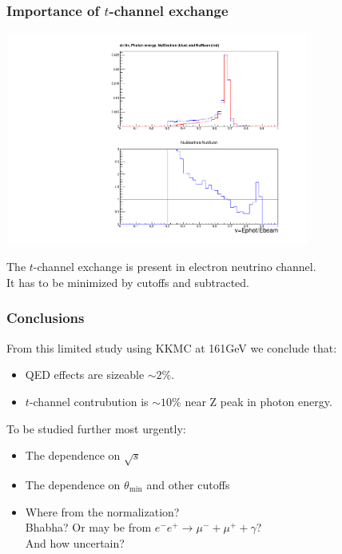 \documentclass{beamer}
\begin{document}
\begin{frame}[fragile]
\frametitle{\bf Importance of $t$-channel exchange}

\vspace{-2mm}
{\includegraphics[width=100mm,height=70mm]{mcNuDiff.pdf}}

\small
The $t$-channel exchange is present in electron neutrino channel.\\
It has to be minimized by cutoffs and subtracted.

\end{frame}

\begin{frame}[fragile]
\frametitle{\bf Conclusions}
\small
From this limited study using KKMC at 161GeV we conclude that:
\begin{itemize}
\item
QED effects are sizeable $\sim 2\%$.
\item
$t$-channel contrubution is $\sim 10\%$ near Z peak in photon energy.
\end{itemize}

To be studied further most urgently:
\begin{itemize}
\item
The dependence on $\sqrt{s}$
\item
The dependence on $\theta_{\min}$ and other cutoffs
\item
Where from the normalization?\\
Bhabha? Or may be from $e^-e^+\to\mu^- +\mu^+ +\gamma$?\\
And how uncertain?
\end{itemize}

\end{frame}
\end{document}
